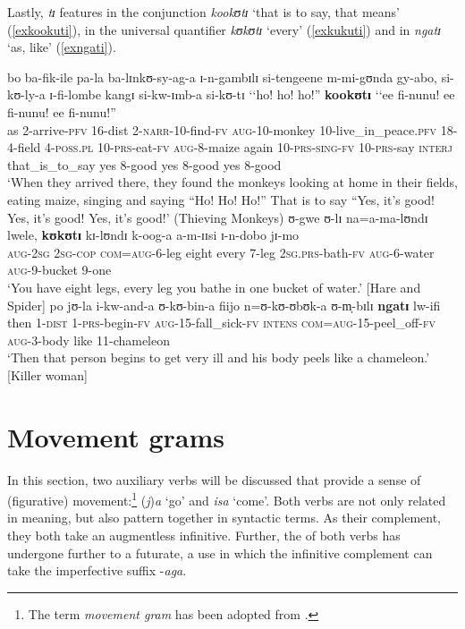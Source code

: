 Lastly, \textit{tɪ} features in the conjunction \textit{kookʊtɪ} `that is to say, that means' (\ref{exkookuti}), in the universal quantifier \textit{kʊkʊtɪ} `every' (\ref{exkukuti}) and in \textit{ngatɪ} `as, like' (\ref{exngati}). 

\begin{exe}
\ex \label{exkookuti}
\gll bo ba-fik-ile pa-la ba-lɪnkʊ-sy-ag-a ɪ-n-gambɪlɪ si-tengeene m-mi-gʊnda gy-abo, si-kʊ-ly-a ɪ-fi-lombe kangɪ si-kw-ɪmb-a si-kʊ-tɪ \textup{\lq\lq}{ho! ho! ho!}\textup{''} \textbf{kookʊtɪ} \textup{\lq\lq}ee fi-nunu! ee fi-nunu! ee fi-nunu!\textup{''}\\
as 2-arrive-\textsc{pfv} 16-{dist} 2-\textsc{narr}-10-find-\textsc{fv} \textsc{aug}-10-monkey 10-live\_in\_peace.\textsc{pfv} 18-4-field 4-\textsc{poss.pl} 10-\textsc{prs}-eat-\textsc{fv} \textsc{aug}-8-maize again 10-\textsc{prs}-\textsc{sing}-\textsc{fv} 10-\textsc{prs}-say \phantom{\lq\lq}\textsc{interj} that\_is\_to\_say \phantom{\lq\lq}yes 8-good yes 8-good yes 8-good\\
\glt `When they arrived there, they found the monkeys looking at home in their fields, eating maize, singing and saying ``Ho! Ho! Ho!'' That is to say ``Yes, it's good! Yes, it's good! Yes, it's good!' (Thieving Monkeys)
\ex \label{exkukuti} \gll ʊ-gwe ʊ-lɪ na=a-ma-lʊndɪ lwele, \textbf{kʊkʊtɪ} kɪ-lʊndɪ k-oog-a a-m-ɪɪsi ɪ-n-dobo jɪ-mo\\
\textsc{aug}-\textsc{2sg} \textsc{2sg}-\textsc{cop} \textsc{com}=\textsc{aug}-6-leg eight every 7-leg \textsc{2sg.prs}-bath-\textsc{fv} \textsc{aug}-6-water \textsc{aug}-9-bucket 9-one\\
\glt `You have eight legs, every leg you bathe in one bucket of water.' [Hare and Spider]
\ex \label{exngati}
\gll po jʊ-la i-kw-and-a ʊ-kʊ-bin-a fiijo n=ʊ-kʊ-ʊbʊk-a ʊ-m̩-bɪlɪ \textbf{ngatɪ} lw-ifi\\
then 1-\textsc{dist} 1-\textsc{prs}-begin-\textsc{fv} \textsc{aug}-15-fall\_sick-\textsc{fv} \textsc{intens} \textsc{com}=\textsc{aug}-15-peel\_off-\textsc{fv} \textsc{aug}-3-body like 11-chameleon\\
\glt \lq Then that person begins to get very ill and his body peels like a chameleon.' [Killer woman]
\end{exe}
\section{Movement grams}\label{MovementGrams}
In this section, two auxiliary verbs will be discussed that provide a sense of (figurative) movement:\footnote{The term \textit{movement gram} has been adopted from \citet{NicolleS2002}.} (\textit{j})\textit{a} `go' and \textit{isa} `come'. Both verbs are not only related in meaning, but also pattern together in syntactic terms. As their complement, they both take an augmentless infinitive. Further, the  of both verbs has undergone further  to a futurate, a use in which the infinitive complement can take the imperfective suffix -\textit{aga}. 

